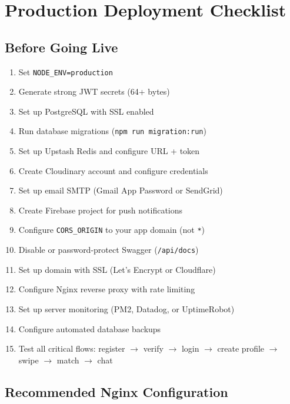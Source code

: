 \documentclass[a4paper,11pt]{article}
\begin{document}

\newpage
\section{Production Deployment Checklist}

\subsection{Before Going Live}

\begin{enumerate}[leftmargin=1.5em]
    \item[$\square$] Set \texttt{NODE\_ENV=production}
    \item[$\square$] Generate strong JWT secrets (64+ bytes)
    \item[$\square$] Set up PostgreSQL with SSL enabled
    \item[$\square$] Run database migrations (\texttt{npm run migration:run})
    \item[$\square$] Set up Upstash Redis and configure URL + token
    \item[$\square$] Create Cloudinary account and configure credentials
    \item[$\square$] Set up email SMTP (Gmail App Password or SendGrid)
    \item[$\square$] Create Firebase project for push notifications
    \item[$\square$] Configure \texttt{CORS\_ORIGIN} to your app domain (not \texttt{*})
    \item[$\square$] Disable or password-protect Swagger (\texttt{/api/docs})
    \item[$\square$] Set up domain with SSL (Let's Encrypt or Cloudflare)
    \item[$\square$] Configure Nginx reverse proxy with rate limiting
    \item[$\square$] Set up server monitoring (PM2, Datadog, or UptimeRobot)
    \item[$\square$] Configure automated database backups
    \item[$\square$] Test all critical flows: register $\to$ verify $\to$ login $\to$ create profile $\to$ swipe $\to$ match $\to$ chat
\end{enumerate}

\subsection{Recommended Nginx Configuration}
\end{document}
